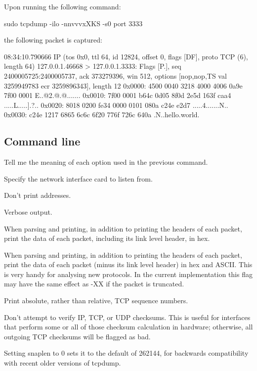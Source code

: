 \documentclass{swfulabreport}
\begin{document}
Upon running the following command:

\begin{shcode}
sudo tcpdump -ilo -nnvvvxXKS -s0 port 3333
\end{shcode}

the following packet is captured:

\begin{outputcode}
08:34:10.790666 IP (tos 0x0, ttl 64, id 12824, offset 0, flags [DF],
proto TCP (6), length 64)
  127.0.0.1.46668 > 127.0.0.1.3333: Flags [P.], seq 2400005725:2400005737,
ack 373279396,
  win 512, options [nop,nop,TS val 3259949783 ecr 3259896343], length 12
      0x0000:  4500 0040 3218 4000 4006 0a9e 7f00 0001  E..@2.@.@.......
      0x0010:  7f00 0001 b64c 0d05 8f0d 2e5d 163f caa4  .....L.....].?..
      0x0020:  8018 0200 fe34 0000 0101 080a c24e e2d7  .....4.......N..
      0x0030:  c24e 1217 6865 6c6c 6f20 776f 726c 640a  .N..hello.world.
\end{outputcode}

\subsection{Command line}

Tell me the meaning of each option used in the previous command.

\begin{description}[align=right,left=2cm,itemindent=-.5em]
\item[-i:] Specify the network interface card to listen from.
\item[-nn:] Don't print addresses.
\item[-vvv:] Verbose output.
\item[-x:] When parsing and printing, in addition to printing the
  headers of each packet, print the data of each packet, including its
  link level header, in hex.
\item[-X:] When parsing and printing, in addition to printing the
  headers of each packet, print the data of each packet (minus its
  link level header) in hex and ASCII.  This is very handy for
  analysing new protocols.  In the current implementation this flag
  may have the same effect as -XX if the packet is truncated.
\item[-S:] Print absolute, rather than relative, TCP sequence numbers.
\item[-K:] Don't attempt to verify IP, TCP, or UDP checksums.  This is
  useful for interfaces that perform some or all of those checksum
  calculation in hardware; otherwise, all outgoing TCP checksums
  will be flagged as bad.
\item[-s0:] Setting snaplen to 0 sets it to the default of 262144, for
  backwards compatibility with recent older versions of tcpdump.
\end{description}
\end{document}
